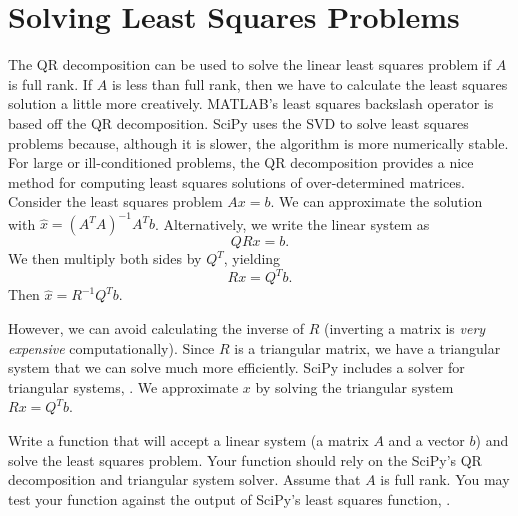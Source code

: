 \section*{Solving Least Squares Problems}
The QR decomposition can be used to solve the linear least squares problem if $A$ is full rank.
If $A$ is less than full rank, then we have to calculate the least squares solution a little more creatively.
MATLAB's least squares backslash operator is based off the QR decomposition.
SciPy uses the SVD to solve least squares problems because, although it is slower, the algorithm is more numerically stable.
For large or ill-conditioned problems, the QR decomposition provides
a nice method for computing least squares solutions of
over-determined matrices.
Consider the least squares problem $Ax=b$.
We can approximate the solution with $\widehat x = (A^T A)^{-1}A^T b$.
Alternatively, we write the linear system as
\[ Q R x = b. \]
We then multiply both sides by $Q^T$, yielding
\[ R x = Q^T b. \]
Then $\widehat x = R^{-1} Q^T b$.

However, we can avoid calculating the inverse of $R$ (inverting a matrix is \emph{very expensive} computationally).
Since $R$ is a triangular matrix, we have a triangular system that we can solve much more efficiently.
SciPy includes a solver for triangular systems, .
We approximate $x$ by solving the triangular system $Rx = Q^T b$.

\begin{problem}
Write a function that will accept a linear system (a matrix $A$ and a vector $b$) and solve the least squares problem.
Your function should rely on the SciPy's QR decomposition and triangular system solver.  Assume that $A$ is full rank.
You may test your function against the output of SciPy's least squares function, .
\end{problem}
